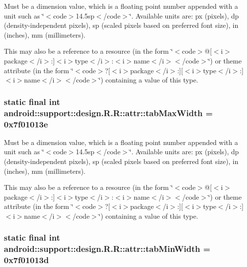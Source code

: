 Must be a dimension value, which is a floating point number appended with a unit such as \char`\"{}$<$code$>$14.5sp$<$/code$>$\char`\"{}. Available units are: px (pixels), dp (density-independent pixels), sp (scaled pixels based on preferred font size), in (inches), mm (millimeters). 

This may also be a reference to a resource (in the form \char`\"{}$<$code$>$@\mbox{[}$<$i$>$package$<$/i$>$:\mbox{]}$<$i$>$type$<$/i$>$:$<$i$>$name$<$/i$>$$<$/code$>$\char`\"{}) or theme attribute (in the form \char`\"{}$<$code$>$?\mbox{[}$<$i$>$package$<$/i$>$:\mbox{]}\mbox{[}$<$i$>$type$<$/i$>$:\mbox{]}$<$i$>$name$<$/i$>$$<$/code$>$\char`\"{}) containing a value of this type. \hypertarget{classandroid_1_1support_1_1design_1_1_r_1_1attr_de727e24bb62edc6d843e9e094f709df}{
\subsubsection[{tabMaxWidth}]{\setlength{\rightskip}{0pt plus 5cm}static final int android::support::design.R.R::attr::tabMaxWidth = 0x7f01013e}}
\label{classandroid_1_1support_1_1design_1_1_r_1_1attr_de727e24bb62edc6d843e9e094f709df}


Must be a dimension value, which is a floating point number appended with a unit such as \char`\"{}$<$code$>$14.5sp$<$/code$>$\char`\"{}. Available units are: px (pixels), dp (density-independent pixels), sp (scaled pixels based on preferred font size), in (inches), mm (millimeters). 

This may also be a reference to a resource (in the form \char`\"{}$<$code$>$@\mbox{[}$<$i$>$package$<$/i$>$:\mbox{]}$<$i$>$type$<$/i$>$:$<$i$>$name$<$/i$>$$<$/code$>$\char`\"{}) or theme attribute (in the form \char`\"{}$<$code$>$?\mbox{[}$<$i$>$package$<$/i$>$:\mbox{]}\mbox{[}$<$i$>$type$<$/i$>$:\mbox{]}$<$i$>$name$<$/i$>$$<$/code$>$\char`\"{}) containing a value of this type. \hypertarget{classandroid_1_1support_1_1design_1_1_r_1_1attr_089c3eed82b1f628916e4b879f70c54a}{
\subsubsection[{tabMinWidth}]{\setlength{\rightskip}{0pt plus 5cm}static final int android::support::design.R.R::attr::tabMinWidth = 0x7f01013d}}
\label{classandroid_1_1support_1_1design_1_1_r_1_1attr_089c3eed82b1f628916e4b879f70c54a}


